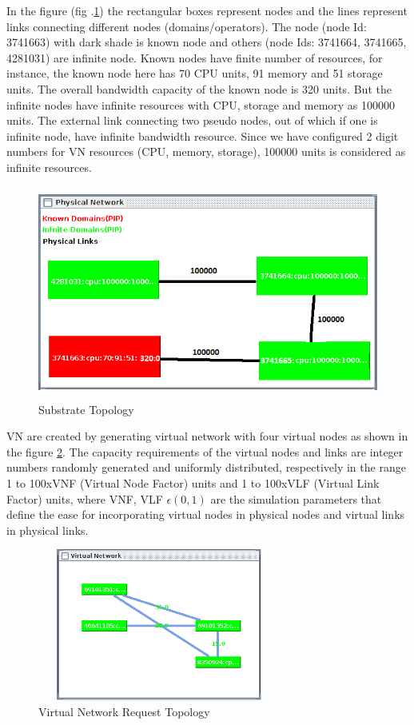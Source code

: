 \documentclass[article,dr=phil,type=msc ,colorback,accentcolor=tud4b]{tudthesis}
\begin{document}
In the figure (fig .\ref{sub_topo}) the rectangular boxes represent nodes and the lines represent links connecting different nodes (domains/operators). The node (node Id: 3741663) with dark shade is known node and others (node Ids: 3741664, 3741665, 4281031) are infinite node. Known nodes have finite number of resources, for instance, the known node here has 70 CPU units, 91 memory and 51 storage units. The overall bandwidth capacity of the known node is 320 units. But the infinite nodes have infinite resources with CPU, storage and memory as 100000 units. The external link connecting two pseudo nodes, out of which if one is infinite node, have infinite bandwidth resource. Since we have configured 2 digit numbers for VN resources (CPU, memory, storage), 100000 units is considered as infinite resources. 

\begin{figure}[h]
	\centering
	\includegraphics[width=12cm, height=7cm]{sub_topo.jpg}
	\caption{Substrate Topology}
	\label{sub_topo}
\end{figure}

VN are created by generating virtual network with four virtual nodes as shown in the figure \ref{virt_topo}. The capacity requirements of the virtual nodes and links are integer numbers randomly generated and uniformly distributed, respectively in the range 1 to 100xVNF (Virtual Node Factor) units and 1 to 100xVLF (Virtual Link Factor) units, where VNF, VLF $\epsilon (0, 1)$ are the simulation parameters that define the ease for incorporating virtual nodes in physical nodes and virtual links in physical links. \newline
\begin{figure}[h]
	\centering
	\includegraphics[width=8cm, height=5cm]{virt_topo.jpg}
	\caption{Virtual Network Request Topology}
	\label{virt_topo}
\end{figure}
\end{document}
